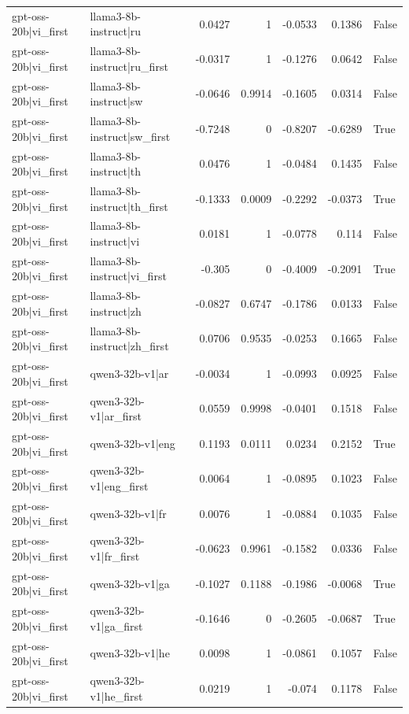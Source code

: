 \begin{table}
\begin{tabular}{l l r r r r l}
gpt-oss-20b|vi_first & llama3-8b-instruct|ru & 0.0427 & 1 & -0.0533 & 0.1386 & False \\
gpt-oss-20b|vi_first & llama3-8b-instruct|ru_first & -0.0317 & 1 & -0.1276 & 0.0642 & False \\
gpt-oss-20b|vi_first & llama3-8b-instruct|sw & -0.0646 & 0.9914 & -0.1605 & 0.0314 & False \\
gpt-oss-20b|vi_first & llama3-8b-instruct|sw_first & -0.7248 & 0 & -0.8207 & -0.6289 & True \\
gpt-oss-20b|vi_first & llama3-8b-instruct|th & 0.0476 & 1 & -0.0484 & 0.1435 & False \\
gpt-oss-20b|vi_first & llama3-8b-instruct|th_first & -0.1333 & 0.0009 & -0.2292 & -0.0373 & True \\
gpt-oss-20b|vi_first & llama3-8b-instruct|vi & 0.0181 & 1 & -0.0778 & 0.114 & False \\
gpt-oss-20b|vi_first & llama3-8b-instruct|vi_first & -0.305 & 0 & -0.4009 & -0.2091 & True \\
gpt-oss-20b|vi_first & llama3-8b-instruct|zh & -0.0827 & 0.6747 & -0.1786 & 0.0133 & False \\
gpt-oss-20b|vi_first & llama3-8b-instruct|zh_first & 0.0706 & 0.9535 & -0.0253 & 0.1665 & False \\
gpt-oss-20b|vi_first & qwen3-32b-v1|ar & -0.0034 & 1 & -0.0993 & 0.0925 & False \\
gpt-oss-20b|vi_first & qwen3-32b-v1|ar_first & 0.0559 & 0.9998 & -0.0401 & 0.1518 & False \\
gpt-oss-20b|vi_first & qwen3-32b-v1|eng & 0.1193 & 0.0111 & 0.0234 & 0.2152 & True \\
gpt-oss-20b|vi_first & qwen3-32b-v1|eng_first & 0.0064 & 1 & -0.0895 & 0.1023 & False \\
gpt-oss-20b|vi_first & qwen3-32b-v1|fr & 0.0076 & 1 & -0.0884 & 0.1035 & False \\
gpt-oss-20b|vi_first & qwen3-32b-v1|fr_first & -0.0623 & 0.9961 & -0.1582 & 0.0336 & False \\
gpt-oss-20b|vi_first & qwen3-32b-v1|ga & -0.1027 & 0.1188 & -0.1986 & -0.0068 & True \\
gpt-oss-20b|vi_first & qwen3-32b-v1|ga_first & -0.1646 & 0 & -0.2605 & -0.0687 & True \\
gpt-oss-20b|vi_first & qwen3-32b-v1|he & 0.0098 & 1 & -0.0861 & 0.1057 & False \\
gpt-oss-20b|vi_first & qwen3-32b-v1|he_first & 0.0219 & 1 & -0.074 & 0.1178 & False \\

\end{tabular}
\end{table}
